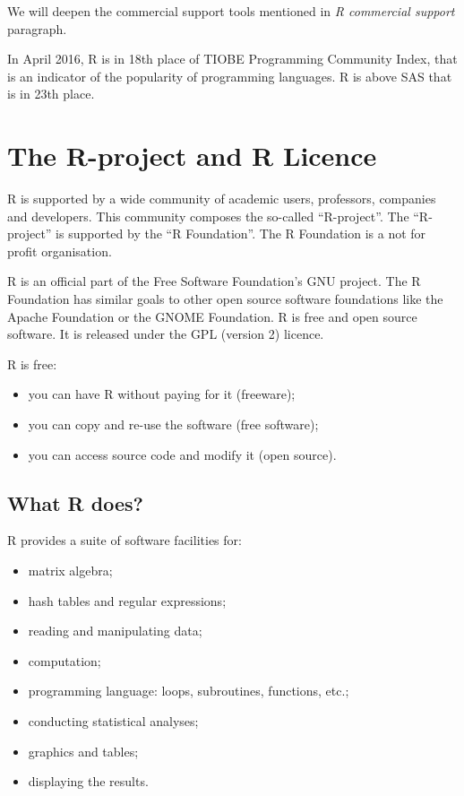\documentclass[]{book}
\providecommand{\tightlist}{%
  \setlength{\itemsep}{0pt}\setlength{\parskip}{0pt}}
\def\tightlist{}
\begin{document}
We will deepen the commercial support tools mentioned in \emph{R
commercial support} paragraph.

In April 2016, R is in 18th place of TIOBE Programming Community Index,
that is an indicator of the popularity of programming languages. R is
above SAS that is in 23th place.

\section{The R-project and R Licence}\label{the-r-project-and-r-licence}

R is supported by a wide community of academic users, professors,
companies and developers. This community composes the so-called
``R-project''. The ``R-project'' is supported by the ``R Foundation''.
The R Foundation is a not for profit organisation.

R is an official part of the Free Software Foundation's GNU project. The
R Foundation has similar goals to other open source software foundations
like the Apache Foundation or the GNOME Foundation. R is free and open
source software. It is released under the GPL (version 2) licence.

R is free:

\begin{itemize}
\tightlist
\item
  you can have R without paying for it (freeware);
\item
  you can copy and re-use the software (free software);
\item
  you can access source code and modify it (open source).
\end{itemize}

\subsection{What R does?}\label{what-r-does}

R provides a suite of software facilities for:

\begin{itemize}
\tightlist
\item
  matrix algebra;
\item
  hash tables and regular expressions;
\item
  reading and manipulating data;
\item
  computation;
\item
  programming language: loops, subroutines, functions, etc.;
\item
  conducting statistical analyses;
\item
  graphics and tables;
\item
  displaying the results.
\end{itemize}
\end{document}
